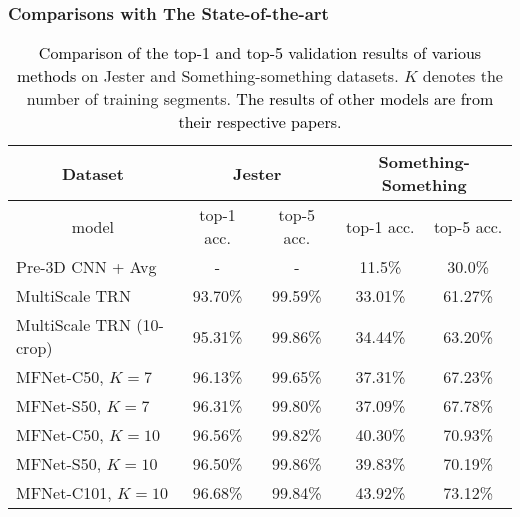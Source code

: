 \documentclass[runningheads]{llncs}
\newcommand{\nj}[1]{\textcolor{black}{#1}}
\begin{document}
\subsubsection{Comparisons with The State-of-the-art}
\setlength{\tabcolsep}{4pt}
\begin{table}[t]
\begin{center}
\caption{\nj{Comparison of the top-1 and top-5 validation results of various methods} on Jester and Something-something datasets. $K$ denotes the number of training segments. \nj{The results of other models are from their respective papers.}}
\begin{tabular}{l|c|c|c|c}
\hline
\multicolumn{1}{c|}{Dataset} & \multicolumn{2}{c|}{Jester} & \multicolumn{2}{c}{Something-Something} \\
\hline
\multicolumn{1}{c|}{model} & top-1 acc.& top-5 acc.& top-1 acc.& top-5 acc.\\
\hline
Pre-3D CNN + Avg\cite{goyal2017something}			& -		  & -       & 11.5\%  & 30.0\%  \\
MultiScale TRN\cite{zhou2017temporal}  				& 93.70\% & 99.59\% & 33.01\% & 61.27\% \\
MultiScale TRN (10-crop)\cite{zhou2017temporal}  	& 95.31\% & 99.86\% & 34.44\% & 63.20\% \\
\hline
MFNet-C50, $K=7$									& 96.13\% & 99.65\% & 37.31\% & 67.23\% \\
MFNet-S50, $K=7$									& 96.31\% & 99.80\% & 37.09\% & 67.78\% \\
MFNet-C50, $K=10$									& 96.56\% & 99.82\% & 40.30\% & 70.93\% \\
MFNet-S50, $K=10$									& 96.50\% & 99.86\% & 39.83\% & 70.19\% \\
MFNet-C101, $K=10$ 									& 96.68\% & 99.84\% & 43.92\% & 73.12\% \\
\hline
\end{tabular}
\label{table:valid_performance}
\end{center}
\end{table}
\setlength{\tabcolsep}{1.4pt}
\end{document}
